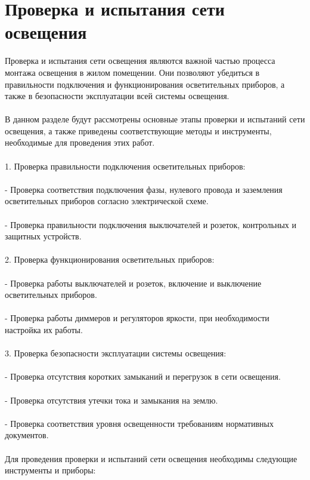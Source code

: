 \documentclass{article}
\begin{document}
\newpage
\section{Проверка и испытания сети освещения}
Проверка и испытания сети освещения являются важной частью процесса монтажа освещения в жилом помещении. Они позволяют убедиться в правильности подключения и функционирования осветительных приборов, а также в безопасности эксплуатации всей системы освещения.\\
~\\
В данном разделе будут рассмотрены основные этапы проверки и испытаний сети освещения, а также приведены соответствующие методы и инструменты, необходимые для проведения этих работ.\\
~\\
1. Проверка правильности подключения осветительных приборов:\\
~\\
- Проверка соответствия подключения фазы, нулевого провода и заземления осветительных приборов согласно электрической схеме.\\
~\\
- Проверка правильности подключения выключателей и розеток, контрольных и защитных устройств.\\
~\\
2. Проверка функционирования осветительных приборов:\\
~\\
- Проверка работы выключателей и розеток, включение и выключение осветительных приборов.\\
~\\
- Проверка работы диммеров и регуляторов яркости, при необходимости настройка их работы.\\
~\\
3. Проверка безопасности эксплуатации системы освещения:\\
~\\
- Проверка отсутствия коротких замыканий и перегрузок в сети освещения.\\
~\\
- Проверка отсутствия утечки тока и замыкания на землю.\\
~\\
- Проверка соответствия уровня освещенности требованиям нормативных документов.\\
~\\
Для проведения проверки и испытаний сети освещения необходимы следующие инструменты и приборы:\\
\end{document}
